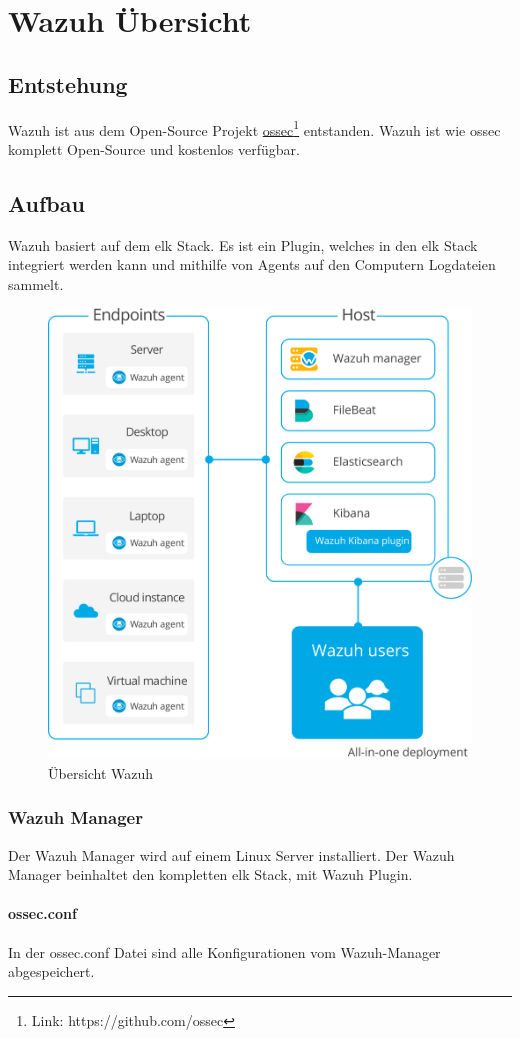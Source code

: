\chapter{Wazuh Übersicht}
\section{Entstehung}
Wazuh ist aus dem Open-Source Projekt \href{https://github.com/ossec}{ossec}\footnote{Link: https://github.com/ossec} entstanden.
Wazuh ist wie ossec komplett Open-Source und kostenlos verfügbar.

\section{Aufbau}
Wazuh basiert auf dem \acrfull{elk} Stack. 
Es ist ein Plugin, welches in den \acrshort{elk} Stack integriert werden kann und mithilfe von Agents auf den Computern Logdateien sammelt.

\begin{figure}[H]
    \centering
    \includegraphics[width=0.5\linewidth]{../img/aufbau-wazuh.png}
    \caption[Übersicht Wazuh]{Übersicht Wazuh\footnotemark}
\end{figure}



\subsection{Wazuh Manager}
Der Wazuh Manager wird auf einem Linux Server installiert.
Der Wazuh Manager beinhaltet den kompletten \acrshort{elk} Stack, mit Wazuh Plugin. 

\subsubsection{ossec.conf}
In der ossec.conf Datei sind alle Konfigurationen vom Wazuh-Manager abgespeichert.

